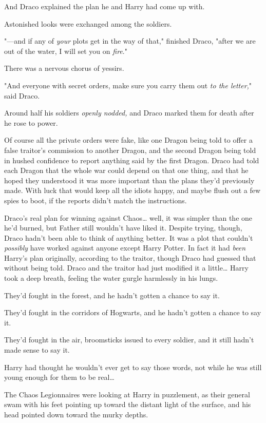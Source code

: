 And Draco explained the plan he and Harry had come up with.

Astonished looks were exchanged among the soldiers.

"---and if any of \emph{your} plots get in the way of that," finished Draco, 
"after we are out of the water, I will set you on \emph{fire}."

There was a nervous chorus of yessirs.

"And everyone with secret orders, make sure you carry them out \emph{to the 
letter,}" said Draco.

Around half his soldiers \emph{openly nodded,} and Draco marked them for death 
after he rose to power.

Of course all the private orders were fake, like one Dragon being told to offer 
a false traitor's commission to another Dragon, and the second Dragon being 
told in hushed confidence to report anything said by the first Dragon. Draco 
had told each Dragon that the whole war could depend on that one thing, and 
that he hoped they understood it was more important than the plans they'd 
previously made. With luck that would keep all the idiots happy, and maybe 
flush out a few spies to boot, if the reports didn't match the instructions.

Draco's real plan for winning against Chaos{\ldots} well, it was simpler than 
the one he'd burned, but Father still wouldn't have liked it. Despite trying, 
though, Draco hadn't been able to think of anything better. It was a plot that 
couldn't \emph{possibly} have worked against anyone except Harry Potter. In 
fact it had \emph{been} Harry's plan originally, according to the traitor, 
though Draco had guessed that without being told. Draco and the traitor had 
just modified it a little{\ldots}
\sbreak
Harry took a deep breath, feeling the water gurgle harmlessly in his lungs.

They'd fought in the forest, and he hadn't gotten a chance to say it.

They'd fought in the corridors of Hogwarts, and he hadn't gotten a chance to 
say it.

They'd fought in the air, broomsticks issued to every soldier, and it still 
hadn't made sense to say it.

Harry had thought he wouldn't ever get to say those words, not while he was 
still young enough for them to be real{\ldots}

The Chaos Legionnaires were looking at Harry in puzzlement, as their general 
swam with his feet pointing up toward the distant light of the surface, and his 
head pointed down toward the murky depths.

